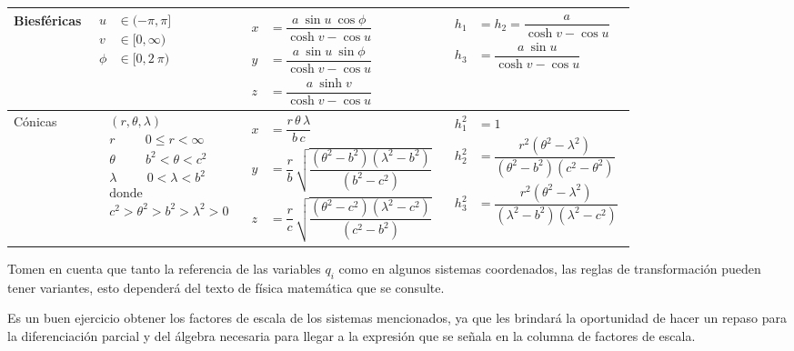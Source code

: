 \documentclass[12pt,landscape]{article}
\numberwithin{equation}{section}
\begin{document}
{\begin{longtable}{| l | p{5cm} | l | p{7.3cm} |}
Biesféricas & $\!\begin{aligned}
u &\in (-\pi, \pi] \\
v &\in [0, \infty) \\
\phi &\in [0, 2\: \pi)
\end{aligned}$ & $\!\begin{aligned}
x &= \dfrac{a \: \sin u \: \cos \phi}{\cosh v - \cos u} \\
y &= \dfrac{a \: \sin u \: \sin \phi}{\cosh v - \cos u} \\
z &= \dfrac{a \: \sinh v}{\cosh v - \cos u}
\end{aligned}$ & $\!\begin{aligned}
h_{1 }&= h_{2} = \dfrac{a}{\cosh v - \cos u} \\
h_{3} &= \dfrac{a \: \sin u}{\cosh v - \cos u}
\end{aligned}$ \\ \hline

Cónicas& $\!\begin{aligned}
&(r, \theta, \lambda) \\
&r \hspace{1cm} 0 \leq r < \infty \\
&\theta \hspace{1cm} b^{2} < \theta < c^{2} \\
&\lambda \hspace{1cm} 0 < \lambda < b^{2} \\
&\mbox{donde }
\\
&c^{2} > \theta^{2} > b^{2} > \lambda^{2} > 0
\end{aligned}$ & $\!\begin{aligned}
x &= \dfrac{r \, \theta \, \lambda}{b \, c} \\
y &= \dfrac{r}{b} \, \sqrt{\dfrac{(\theta^{2} - b^{2})(\lambda^{2} - b^{2})}{(b^{2} - c^{2})}} \\
z &= \dfrac{r}{c} \, \sqrt{\dfrac{(\theta^{2} - c^{2})(\lambda^{2} - c^{2})}{(c^{2} - b^{2})}}
\end{aligned}$ & $\!\begin{aligned}
h_{1}^{2} &= 1\\
h_{2}^{2} &= \dfrac{r^{2} (\theta^{2} - \lambda^{2})}{(\theta^{2} - b^{2})(c^{2} - \theta^{2})} \\
h_{3}^{2} &= \dfrac{r^{2} (\theta^{2} - \lambda^{2})}{(\lambda^{2} - b^{2})(\lambda^{2} - c^{2})}
\end{aligned}$ \\ \hline
\end{longtable}}

\linespread{1.5}\selectfont
Tomen en cuenta que tanto la referencia de las variables $q_{i}$ como en algunos sistemas coordenados, las reglas de transformación pueden tener variantes, esto dependerá del texto de física matemática que se consulte.
\par
Es un buen ejercicio obtener los factores de escala de los sistemas mencionados, ya que les brindará la oportunidad de hacer un repaso para la diferenciación parcial y del álgebra necesaria para llegar a la expresión que se señala en la columna de factores de escala.
\end{document}
